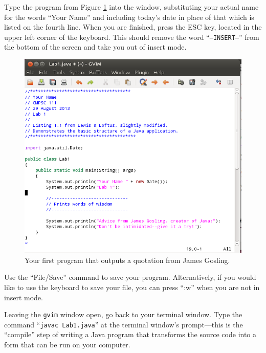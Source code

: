 Type the program from Figure \ref{lab1prog} into the window, substituting your actual name for the words ``Your Name''
and including today's date in place of that which is listed on the fourth line. When you are finished, press the ESC
key, located in the upper left corner of the keyboard.  This should remove the word ``{\tt --INSERT--}'' from the bottom
of the screen and take you out of insert mode.

\begin{figure}[tbp]
  \centering
  \includegraphics[width=5.8in]{images/lab1prog}
  \caption{Your first program that outputs a quotation from James Gosling.}
  \label{lab1prog}
\end{figure}

Use the ``File/Save'' command to save your program. Alternatively, if you would like to use the keyboard to save your
file, you can press ``:w'' when you are not in insert mode.


Leaving the {\tt gvim} window open, go back to your terminal window. Type the command ``{\tt javac Lab1.java}'' at the
terminal window's prompt---this is the ``compile'' step of writing a Java program that transforms the source code into a
form that can be run on your computer.

